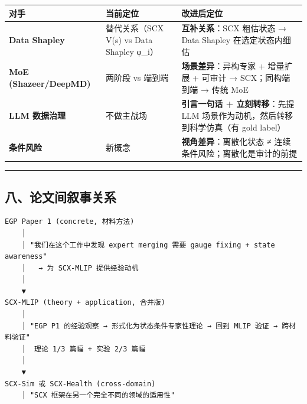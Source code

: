 \documentclass[
  12pt,
]{ctexart}
\begin{document}
\begin{longtable}[]{@{}
  >{\raggedright\arraybackslash}p{}
  >{\raggedright\arraybackslash}p{}
  >{\raggedright\arraybackslash}p{}@{}}
\toprule\noalign{}
\begin{minipage}[b]{\linewidth}\raggedright
对手
\end{minipage} & \begin{minipage}[b]{\linewidth}\raggedright
当前定位
\end{minipage} & \begin{minipage}[b]{\linewidth}\raggedright
改进后定位
\end{minipage} \\
\midrule\noalign{}
\endhead
\bottomrule\noalign{}
\endlastfoot
\textbf{Data Shapley} & 替代关系（SCX V(s) vs Data Shapley φ\_i） &
\textbf{互补关系}：SCX 粗估状态 → Data Shapley 在选定状态内细估 \\
\textbf{MoE (Shazeer/DeepMD)} & 两阶段 vs 端到端 &
\textbf{场景差异}：异构专家 + 增量扩展 + 可审计 → SCX；同构端到端 → 传统
MoE \\
\textbf{LLM 数据治理} & 不做主战场 & \textbf{引言一句话 +
立刻转移}：先提 LLM 场景作为动机，然后转移到科学仿真（有 gold label） \\
\textbf{条件风险} & 新概念 & \textbf{视角差异}：离散化状态 ≠
连续条件风险；离散化是审计的前提 \\
\end{longtable}

\begin{center}\rule{0.5\linewidth}{0.5pt}\end{center}

\subsection{八、论文间叙事关系}\label{ux516bux8bbaux6587ux95f4ux53d9ux4e8bux5173ux7cfb}

\begin{verbatim}
EGP Paper 1 (concrete, 材料方法)
    │
    │ "我们在这个工作中发现 expert merging 需要 gauge fixing + state awareness"
    │   → 为 SCX-MLIP 提供经验动机
    │
    ▼
SCX-MLIP (theory + application, 合并版)
    │
    │ "EGP P1 的经验观察 → 形式化为状态条件专家性理论 → 回到 MLIP 验证 → 跨材料验证"
    │  理论 1/3 篇幅 + 实验 2/3 篇幅
    │
    ▼
SCX-Sim 或 SCX-Health (cross-domain)
    │ "SCX 框架在另一个完全不同的领域的适用性"
\end{verbatim}
\end{document}
